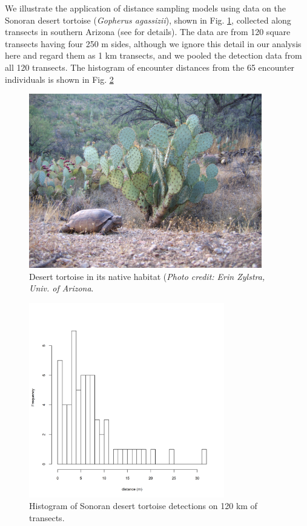 We illustrate the application of distance sampling models using data
on the Sonoran desert tortoise ({\it Gopherus agassizii}), shown in
Fig. \ref{closed.fig.tortoise}, collected along transects
in southern Arizona (see \citet{zylstra_etal:2010} for
details). The data are from 120 square transects having four 250 m sides,
 although we ignore this detail in our analysis here and regard
them as 1 km transects, and we pooled the detection data from all
120 transects. The histogram of encounter distances from the 65
encounter individuals is
shown in Fig. \ref{closed.fig.tortoisehist}
\begin{figure}
\centering
\includegraphics[height=3in,width=4in]{Ch3-Closed/figs/Erin_Zylstra_2.jpg}
\caption{Desert tortoise in its native habitat ({\it Photo credit: Erin
  Zylstra, Univ. of Arizona}.}
\label{closed.fig.tortoise}
\end{figure}

\begin{figure}
\centering
\includegraphics[height=3.35in,width=3.35in]{Ch3-Closed/figs/tortoise.png}
\caption{Histogram of Sonoran desert tortoise detections on 120 km of
transects.}
\label{closed.fig.tortoisehist}
\end{figure}

